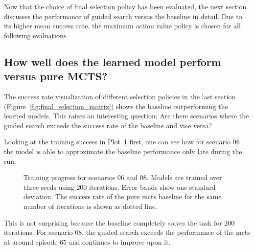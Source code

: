 Now that the choice of final selection policy has been evaluated, the next section discusses the performance of guided search versus the baseline in detail. Due to its higher mean success rate, the maximum action value policy is chosen for all following evaluations.


\subsection{How well does the learned model perform versus pure MCTS?}\label{ssec:eval_vs_mcts}
The success rate visualization of different selection policies in the last section (Figure~\ref{fig:final_selection_matrix}) shows the baseline outperforming the learned models. This raises an interesting question: Are there scenarios where the guided search exceeds the success rate of the baseline and vice versa?

Looking at the training success in Plot~\ref{fig:train_success_shaded} first, one can see how for scenario 06 the model is able to approximate the baseline performance only late during the run. 
\begin{figure}[h]
	\centering
	\captionsetup{justification=centering}
	\scalebox{0.9}{
    
    }
	\caption[Training plots for different scenarios]{Training progress for scenarios 06 and 08. Models are trained over three seeds using $200$ iterations. Error bands show one standard deviation. The success rate of the pure \gls{mcts} baseline for the same number of iterations is shown as dotted line.}
\label{fig:train_success_shaded}
\end{figure}
This is not surprising because the baseline completely solves the task for $200$ iterations. For scenario 08, the guided search exceeds the performance of the \gls{mcts} at around episode $65$ and continues to improve upon it.


